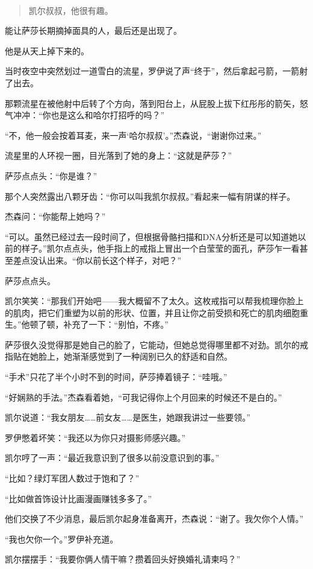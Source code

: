 \documentclass[../main]{subfiles}
\begin{document}
~\

\begin{quote}
    凯尔叔叔，他很有趣。
\end{quote}

能让萨莎长期摘掉面具的人，最后还是出现了。

他是从天上掉下来的。

当时夜空中突然划过一道雪白的流星，罗伊说了声“终于”，然后拿起弓箭，一箭射了出去。

那颗流星在被他射中后转了个方向，落到阳台上，从屁股上拔下红彤彤的箭矢，怒气冲冲：“你也是这么和哈尔打招呼的吗？”

“不，他一般会按着耳麦，来一声‘哈尔叔叔’。”杰森说，“谢谢你过来。”

流星里的人环视一圈，目光落到了她的身上：“这就是萨莎？”

萨莎点点头：“你是谁？”

那个人突然露出八颗牙齿：“你可以叫我凯尔叔叔。”看起来一幅有阴谋的样子。

杰森问：“你能帮上她吗？”

“可以。虽然已经过去一段时间了，但根据骨骼扫描和DNA分析还是可以知道她以前的样子。”凯尔点点头，他手指上的戒指上冒出一个白莹莹的面孔，萨莎乍一看甚至差点没认出来。“你以前长这个样子，对吧？”

萨莎点点头。

凯尔笑笑：“那我们开始吧——我大概留不了太久。这枚戒指可以帮我梳理你脸上的肌肉，把它们重塑为以前的形状、位置，并且让你之前受损和死亡的肌肉细胞重生。”他顿了顿，补充了一下：“别怕，不疼。”

萨莎很久没觉得那是她自己的脸了，它能动，但她总觉得哪里都不对劲。凯尔的戒指贴在她脸上，她渐渐感觉到了一种阔别已久的舒适和自然。

“手术”只花了半个小时不到的时间，萨莎捧着镜子：“哇哦。”

“好娴熟的手法。”杰森看着她，“可我记得你上个月回来的时候还不是白的。”

凯尔说道：“我女朋友……前女友……是医生，她跟我讲过一些要领。”

罗伊憋着坏笑：“我还以为你只对摄影师感兴趣。”

凯尔哼了一声：“最近我意识到了很多以前没意识到的事。”

“比如？绿灯军团人数过于饱和了？”

“比如做首饰设计比画漫画赚钱多多了。”

他们交换了不少消息，最后凯尔起身准备离开，杰森说：“谢了。我欠你个人情。”

“我也欠你一个。”罗伊补充道。

凯尔摆摆手：“我要你俩人情干嘛？攒着回头好换婚礼请柬吗？”
\end{document}
